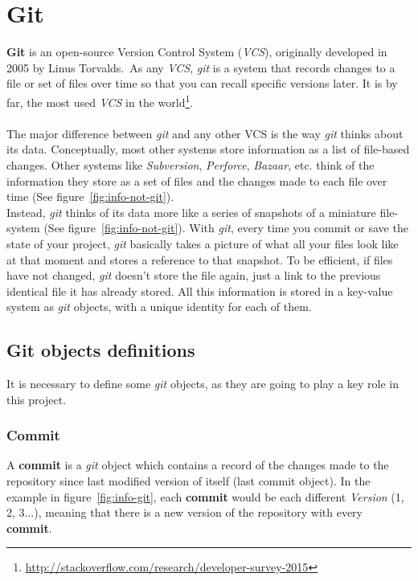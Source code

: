 \documentclass[a4paper, 12pt]{book}
\begin{document}
\section{Git}
\label{sec:git}
\textbf{Git} is an open-source Version Control System (\emph{VCS}), originally developed in 2005 by Linus Torvalds.\
As any \emph{VCS}, \emph{git} is a system that records changes to a file or set of files over time
so that you can recall specific versions later.
It is by far, the most used \emph{VCS} in the world\footnote{\url{http://stackoverflow.com/research/developer-survey-2015}}.\\\\
The major difference between \emph{git} and any other VCS is the way \emph{git} thinks about its data.
Conceptually, most other systems store information as a list of file-based changes. Other systems like \textit{Subversion},
\textit{Perforce}, \textit{Bazaar}, etc. think of the information they store as a set of files and the changes made to each
file over time (See figure~\ref{fig:info-not-git}).\\
Instead, \emph{git} thinks of its data more like a series of snapshots of a miniature file-system (See figure~\ref{fig:info-not-git}).
With \emph{git}, every time you commit or save the state of your project, \emph{git} basically takes a picture of what all
your files look like at that moment and stores a reference to that snapshot. To be efficient, if files have not changed,
\emph{git} doesn't store the file again, just a link to the previous identical file it has already stored.
All this information is stored in a key-value system as \emph{git} objects, with a unique identity for each of them.
\subsection{Git objects definitions}
\label{ssec:git-definitions}
It is necessary to define some \emph{git} objects, as they are going to play a key role in this project.
\subsubsection{Commit}
A \textbf{commit} is a \emph{git} object which contains a record of the changes made to the repository since last modified
version of itself (last commit object). In the example in figure~\ref{fig:info-git}, each \textbf{commit} would be each different
\textit{Version} (1, 2, 3...), meaning that there is a new version of the repository with every \textbf{commit}.
\end{document}
